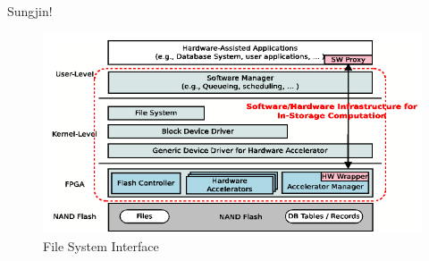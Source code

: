 Sungjin!

\begin{figure}[h]
	\begin{center}
	\includegraphics[width=0.4\paperwidth]{figures/swstack.png}
	\caption{File System Interface}
	\label{fig:filesystem}
	\end{center}
\end{figure}
